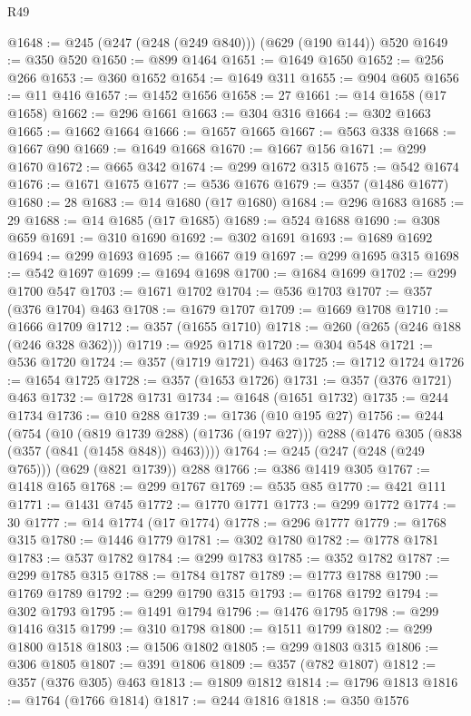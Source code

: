 \begin{lexlean}{R49}
\begin{coremodule}
@1648 := @245 (@247 (@248 (@249 @840))) (@629 (@190 @144)) @520
@1649 := @350 @520
@1650 := @899 @1464
@1651 := @1649 @1650
@1652 := @256 @266
@1653 := @360 @1652
@1654 := @1649 @311
@1655 := @904 @605
@1656 := @11 @416
@1657 := @1452 @1656
@1658 := 27
@1661 := @14 @1658 (@17 @1658)
@1662 := @296 @1661
@1663 := @304 @316
@1664 := @302 @1663
@1665 := @1662 @1664
@1666 := @1657 @1665
@1667 := @563 @338
@1668 := @1667 @90
@1669 := @1649 @1668
@1670 := @1667 @156
@1671 := @299 @1670
@1672 := @665 @342
@1674 := @299 @1672 @315
@1675 := @542 @1674
@1676 := @1671 @1675
@1677 := @536 @1676
@1679 := @357 (@1486 @1677)
@1680 := 28
@1683 := @14 @1680 (@17 @1680)
@1684 := @296 @1683
@1685 := 29
@1688 := @14 @1685 (@17 @1685)
@1689 := @524 @1688
@1690 := @308 @659
@1691 := @310 @1690
@1692 := @302 @1691
@1693 := @1689 @1692
@1694 := @299 @1693
@1695 := @1667 @19
@1697 := @299 @1695 @315
@1698 := @542 @1697
@1699 := @1694 @1698
@1700 := @1684 @1699
@1702 := @299 @1700 @547
@1703 := @1671 @1702
@1704 := @536 @1703
@1707 := @357 (@376 @1704) @463
@1708 := @1679 @1707
@1709 := @1669 @1708
@1710 := @1666 @1709
@1712 := @357 (@1655 @1710)
@1718 := @260 (@265 (@246 @188 (@246 @328 @362)))
@1719 := @925 @1718
@1720 := @304 @548
@1721 := @536 @1720
@1724 := @357 (@1719 @1721) @463
@1725 := @1712 @1724
@1726 := @1654 @1725
@1728 := @357 (@1653 @1726)
@1731 := @357 (@376 @1721) @463
@1732 := @1728 @1731
@1734 := @1648 (@1651 @1732)
@1735 := @244 @1734
@1736 := @10 @288
@1739 := @1736 (@10 @195 @27)
@1756 := @244
    (@754
      (@10 (@819 @1739 @288) (@1736 (@197 @27)))
      @288
      (@1476 @305 (@838 (@357 (@841 (@1458 @848)) @463))))
@1764 := @245 (@247 (@248 (@249 @765))) (@629 (@821 @1739)) @288
@1766 := @386 @1419 @305
@1767 := @1418 @165
@1768 := @299 @1767
@1769 := @535 @85
@1770 := @421 @111
@1771 := @1431 @745
@1772 := @1770 @1771
@1773 := @299 @1772
@1774 := 30
@1777 := @14 @1774 (@17 @1774)
@1778 := @296 @1777
@1779 := @1768 @315
@1780 := @1446 @1779
@1781 := @302 @1780
@1782 := @1778 @1781
@1783 := @537 @1782
@1784 := @299 @1783
@1785 := @352 @1782
@1787 := @299 @1785 @315
@1788 := @1784 @1787
@1789 := @1773 @1788
@1790 := @1769 @1789
@1792 := @299 @1790 @315
@1793 := @1768 @1792
@1794 := @302 @1793
@1795 := @1491 @1794
@1796 := @1476 @1795
@1798 := @299 @1416 @315
@1799 := @310 @1798
@1800 := @1511 @1799
@1802 := @299 @1800 @1518
@1803 := @1506 @1802
@1805 := @299 @1803 @315
@1806 := @306 @1805
@1807 := @391 @1806
@1809 := @357 (@782 @1807)
@1812 := @357 (@376 @305) @463
@1813 := @1809 @1812
@1814 := @1796 @1813
@1816 := @1764 (@1766 @1814)
@1817 := @244 @1816
@1818 := @350 @1576

\end{coremodule}
\end{lexlean}

